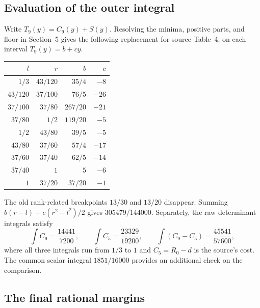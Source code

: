 \subsection{Evaluation of the outer integral}
\label{appb-outer}

Write $T_9(y)=C_9(y)+S(y)$.  Resolving the minima, positive parts,
and floor in Section~5 gives the following replacement for source
Table~4; on each interval $T_9(y)=b+cy$.
\begin{center}
\begin{tabular}{rrrr}
\hline
$l$&$r$&$b$&$c$\\
\hline
$1/3$&$43/120$&$35/4$&$-8$\\
$43/120$&$37/100$&$76/5$&$-26$\\
$37/100$&$37/80$&$267/20$&$-21$\\
$37/80$&$1/2$&$119/20$&$-5$\\
$1/2$&$43/80$&$39/5$&$-5$\\
$43/80$&$37/60$&$57/4$&$-17$\\
$37/60$&$37/40$&$62/5$&$-14$\\
$37/40$&$1$&$5$&$-6$\\
$1$&$37/20$&$37/20$&$-1$\\
\hline
\end{tabular}
\end{center}
The old rank-related breakpoints $13/30$ and $13/20$ disappear.
Summing $b(r-l)+c(r^2-l^2)/2$ gives $305479/144000$.
Separately, the raw determinant integrals satisfy
\[
 \int C_9=\frac{14441}{7200},\qquad
 \int C_5=\frac{23329}{19200},\qquad
 \int(C_9-C_5)=\frac{45541}{57600},
\]
where all three integrals run from $1/3$ to $1$ and
$C_5=R_0-d$ is the source's cost.  The common scalar integral
$1851/16000$ provides an additional check on the comparison.

\subsection{The final rational margins}
\label{appb-margins}


